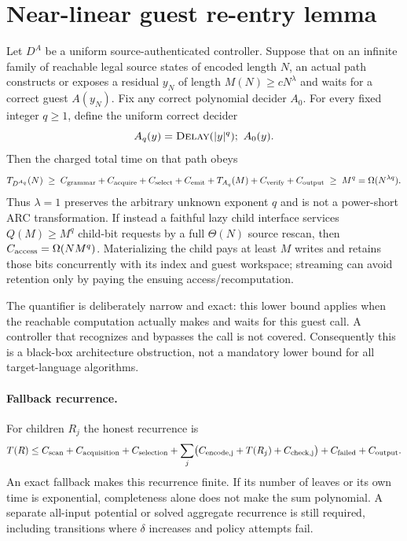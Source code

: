 \documentclass[11pt]{article}
\begin{document}
\section{Near-linear guest re-entry lemma}
Let $D^A$ be a uniform source-authenticated controller.  Suppose that on an
infinite family of reachable legal source states of encoded length $N$, an
actual path constructs or exposes a residual $y_N$ of length
$M(N)\ge cN^\lambda$ and waits for a correct guest $A(y_N)$.  Fix any correct
polynomial decider $A_0$.  For every fixed integer $q\ge1$, define the uniform
correct decider
\[
 A_q(y)=\textsc{Delay}(|y|^q);\ A_0(y).
\]
Then the charged total time on that path obeys
\[
 T_{D^{A_q}}(N)\;\ge\; C_{\rm grammar}+C_{\rm acquire}+C_{\rm select}
 +C_{\rm emit}+T_{A_q}(M)+C_{\rm verify}+C_{\rm output}
 \;\ge\;M^q=\Omega(N^{\lambda q}).
\]
Thus $\lambda=1$ preserves the arbitrary unknown exponent $q$ and is not a
power-short ARC transformation.  If instead a faithful lazy child interface
services $Q(M)\ge M^q$ child-bit requests by a full $\Theta(N)$ source rescan,
then $C_{\rm access}=\Omega(NM^q)$.  Materializing the child pays at least $M$
writes and retains those bits concurrently with its index and guest workspace;
streaming can avoid retention only by paying the ensuing access/recomputation.

The quantifier is deliberately narrow and exact: this lower bound applies when
the reachable computation actually makes and waits for this guest call.  A
controller that recognizes and bypasses the call is not covered.  Consequently
this is a black-box architecture obstruction, not a mandatory lower bound for
all target-language algorithms.

\paragraph{Fallback recurrence.}
For children $R_j$ the honest recurrence is
\[
 T(R)\le C_{\rm scan}+C_{\rm acquisition}+C_{\rm selection}
 +\sum_j\bigl(C_{\rm encode,j}+T(R_j)+C_{\rm check,j}\bigr)
 +C_{\rm failed}+C_{\rm output}.
\]
An exact fallback makes this recurrence finite.  If its number of leaves or
its own time is exponential, completeness alone does not make the sum
polynomial.  A separate all-input potential or solved aggregate recurrence is
still required, including transitions where $\delta$ increases and policy
attempts fail.
\end{document}
